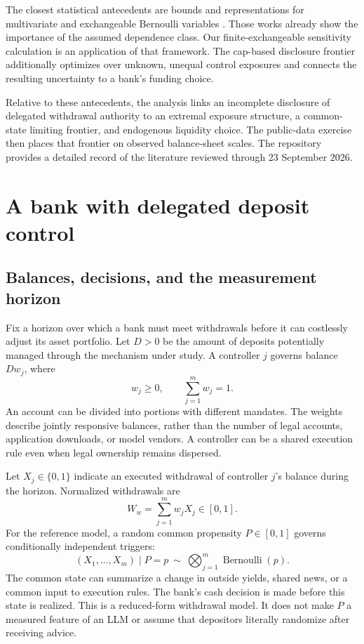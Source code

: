 \documentclass[11pt]{article}
\theoremstyle{definition}\newtheorem{definition}[theorem]{Definition}
\begin{document}
The closest statistical antecedents are bounds and representations for multivariate and exchangeable Bernoulli variables \citep{fontana2022,fontana2023}. Those works already show the importance of the assumed dependence class. Our finite-exchangeable sensitivity calculation is an application of that framework. The cap-based disclosure frontier additionally optimizes over unknown, unequal control exposures and connects the resulting uncertainty to a bank's funding choice.

Relative to these antecedents, the analysis links an incomplete disclosure of delegated withdrawal authority to an extremal exposure structure, a common-state limiting frontier, and endogenous liquidity choice. The public-data exercise then places that frontier on observed balance-sheet scales. The repository provides a detailed record of the literature reviewed through 23 September 2026.

\section{A bank with delegated deposit control}
\subsection{Balances, decisions, and the measurement horizon}
Fix a horizon over which a bank must meet withdrawals before it can costlessly adjust its asset portfolio. Let \(D>0\) be the amount of deposits potentially managed through the mechanism under study. A controller \(j\) governs balance \(Dw_j\), where
\begin{equation}
 w_j\geq0,\qquad \sum_{j=1}^{m}w_j=1.
 \label{eq:weights}
\end{equation}
An account can be divided into portions with different mandates. The weights describe jointly responsive balances, rather than the number of legal accounts, application downloads, or model vendors. A controller can be a shared execution rule even when legal ownership remains dispersed.

Let \(X_j\in\{0,1\}\) indicate an executed withdrawal of controller \(j\)'s balance during the horizon. Normalized withdrawals are
\begin{equation}
 W_w=\sum_{j=1}^m w_jX_j\in[0,1].
 \label{eq:W}
\end{equation}
For the reference model, a random common propensity \(P\in[0,1]\) governs conditionally independent triggers:
\begin{equation}
 (X_1,\ldots,X_m)\mid P=p\ \sim\ \bigotimes_{j=1}^m\operatorname{Bernoulli}(p).
 \label{eq:conditional}
\end{equation}
The common state can summarize a change in outside yields, shared news, or a common input to execution rules. The bank's cash decision is made before this state is realized. This is a reduced-form withdrawal model. It does not make \(P\) a measured feature of an LLM or assume that depositors literally randomize after receiving advice.
\end{document}

